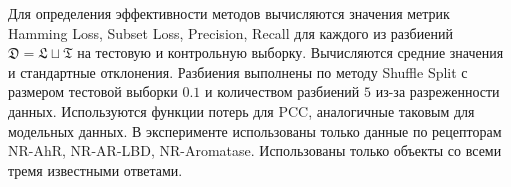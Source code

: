 \documentclass[12pt,twoside]{article}
\begin{document}
Для определения эффективности методов вычисляются значения метрик Hamming Loss, Subset Loss, Precision, Recall для каждого из разбиений $\mathfrak{D}=\mathfrak{L}\sqcup\mathfrak{T}$ на тестовую и контрольную выборку. Вычисляются средние значения и стандартные отклонения. Разбиения выполнены по методу Shuffle Split с размером тестовой выборки $0.1$ и количеством разбиений $5$ из-за разреженности данных. Используются функции потерь для PCC, аналогичные таковым для модельных данных. В эксперименте использованы только данные по рецепторам NR-AhR, NR-AR-LBD, NR-Aromatase. Использованы только объекты со всеми тремя известными ответами.


\end{document}
